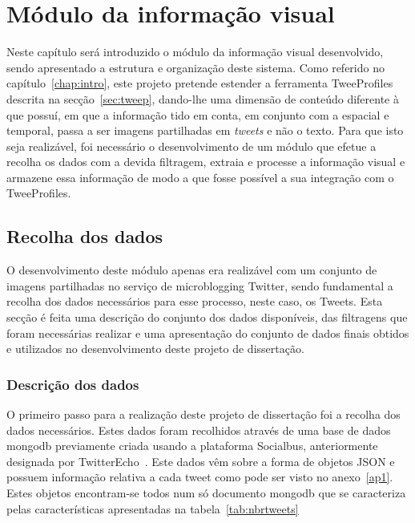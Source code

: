 \chapter{Módulo da informação visual} \label{chap:chap3}

Neste capítulo será introduzido o módulo da informação visual desenvolvido, sendo apresentado a estrutura e organização deste sistema. Como referido no capítulo~\ref{chap:intro}, este projeto pretende estender a ferramenta TweeProfiles descrita na secção~\ref{sec:tweep}, dando-lhe uma dimensão de conteúdo diferente à que possuí, em que a informação tido em conta, em conjunto com a espacial e temporal, passa a ser imagens partilhadas em \textit{tweets} e não o texto. Para que isto seja realizável, foi necessário o desenvolvimento de um módulo que efetue a recolha os dados com a devida filtragem, extraia e processe a informação visual e armazene essa informação de modo a que fosse possível a sua integração com o TweeProfiles.

\section{Recolha dos dados}

O desenvolvimento deste módulo apenas era realizável com um conjunto de imagens partilhadas no serviço de microblogging Twitter, sendo fundamental a recolha dos dados necessários para esse processo, neste caso, os Tweets. Esta secção é feita uma descrição do conjunto dos dados disponíveis, das filtragens que foram necessárias realizar e uma apresentação do conjunto de dados finais obtidos e utilizados no desenvolvimento deste projeto de dissertação.

\subsection{Descrição dos dados}

O primeiro passo para a realização deste projeto de dissertação foi a recolha dos dados necessários. Estes dados foram recolhidos através de uma base de dados mongodb previamente criada usando a plataforma Socialbus, anteriormente designada por TwitterEcho~\cite{Boanjak2012}. Este dados vêm sobre a forma de objetos JSON e possuem informação relativa a cada tweet como pode ser visto no anexo~\ref{ap1}. Estes objetos encontram-se todos num só documento mongodb que se caracteriza pelas características apresentadas na tabela~\ref{tab:nbrtweets}

